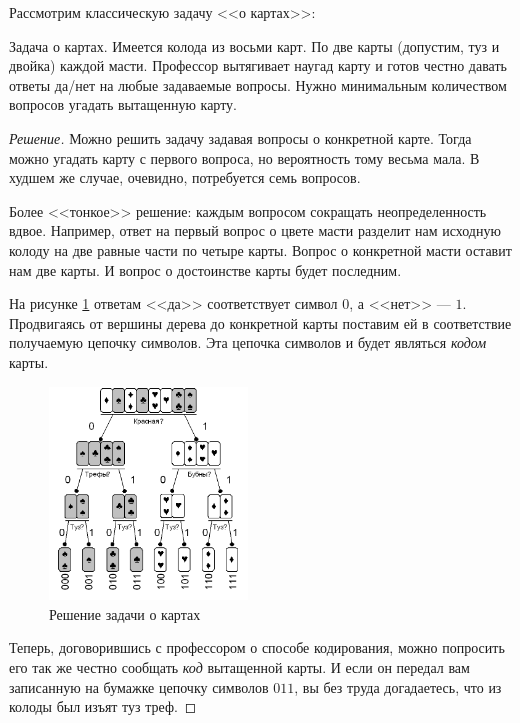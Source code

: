 Рассмотрим классическую задачу <<о картах>>:
\begin{exampl}
    \label{exampl:code:cards}
    Задача о картах. Имеется колода из восьми карт. По две карты (допустим, туз и двойка) каждой масти. Профессор вытягивает наугад карту и готов честно давать ответы да/нет на любые задаваемые вопросы. Нужно минимальным количеством вопросов угадать вытащенную карту.
\end{exampl}
\begin{proof}[Решение]
    Можно решить задачу задавая вопросы о конкретной карте. Тогда можно угадать карту с первого вопроса, но вероятность тому весьма мала. В худшем же случае, очевидно, потребуется семь вопросов.
    
    Более <<тонкое>> решение: каждым вопросом сокращать неопределенность вдвое. Например, ответ на первый вопрос о цвете масти разделит нам исходную колоду на две равные части по четыре карты. Вопрос о конкретной масти оставит нам две карты. И вопрос о достоинстве карты будет последним. 
    
    На рисунке \ref{fig:code:cards} ответам <<да>> соответствует символ $0$, а <<нет>> --- $1$. Продвигаясь от вершины дерева до конкретной карты поставим ей в соответствие получаемую цепочку символов. Эта цепочка символов и будет являться \emph{кодом} карты.
    
    \begin{figure}
        \centering
        \includegraphics[width=0.47\textwidth]{fig/cards}
        \caption{Решение задачи о картах}
        \label{fig:code:cards}
    \end{figure}
    
    Теперь, договорившись с профессором о способе кодирования, можно попросить его так же честно сообщать \emph{код} вытащенной карты. И если он передал вам записанную на бумажке цепочку символов $011$, вы без труда догадаетесь, что из колоды был изъят туз треф.
\end{proof}

